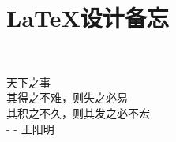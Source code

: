 \chapter{\LaTeX 设计备忘}
\thispagestyle{fancy}
\fancyhead[ER]{\song\wuhao\leftmark}\fancyhead[OL]{\song\wuhao\rightmark}
\fancyhead[EL]{\song\wuhao\rightmark}\fancyhead[OR]{\song\wuhao\leftmark}



~\\[9cm]
\begin{flushright}
\kai\xiaosi
\textcolor[rgb]{0.00,0.50,0.00}{
天下之事\\
其得之不难，则失之必易\\
其积之不久，则其发之必不宏\\
- - 王阳明}
\end{flushright}



















